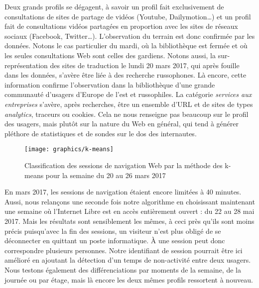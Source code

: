 \documentclass[symmetric,justified,marginals=raggedouter]{tufte-book}
\begin{document}
Deux grands profils se dégagent, à savoir un profil fait exclusivement de consultations de sites de partage de vidéos (Youtube, Dailymotion\ldots{}) et un profil fait de consultations vidéos partagées en proportion avec les sites de réseaux sociaux (Facebook, Twitter\ldots{}). L'observation du terrain est donc confirmée par les données. Notons le cas particulier du mardi, où la bibliothèque est fermée et où les seules consultations Web sont celles des gardiens. Notons aussi, la sur-représentation des sites de traduction le lundi 20 mars 2017, qui après fouille dans les données, s'avère être liée à des recherche russophones. Là encore, cette information confirme l'observation dans la bibliothèque d'une grande communauté d'usagers d'Europe de l'est et russophiles. La catégorie \textit{services aux entreprises} s'avère, après recherches, être un ensemble d'URL et de sites de types \textit{analytics}, traceurs ou cookies. Cela ne nous renseigne pas beaucoup sur le profil des usagers, mais plutôt sur la nature du Web en général, qui tend à générer pléthore de statistiques et de sondes sur le dos des internautes.

\begin{figure*}
  \texttt{[image: graphics/k-means]}
  \caption{Classification des sessions de navigation Web par la méthode des k-means pour la semaine du 20 au 26 mars 2017}
  \label{fig:k-means}
\end{figure*}

\noindent En mars 2017, les sessions de navigation étaient encore limitées à 40 minutes. Aussi, nous relançons une seconde fois notre algorithme en choisissant maintenant une semaine où l'Internet Libre est en accès entièrement ouvert : du 22 au 28 mai 2017. Mais les résultats sont sensiblement les mêmes, à ceci près qu'ils sont moins précis puisqu'avec la fin des sessions, un visiteur n'est plus obligé de se déconnecter en quittant un poste informatique. À une session peut donc correspondre plusieurs personnes. Notre identifiant de session pourrait être ici amélioré en ajoutant la détection d'un temps de non-activité entre deux usagers. Nous testons également des différenciations par moments de la semaine, de la journée ou par étage, mais là encore les deux mêmes profils ressortent à nouveau.
\end{document}
